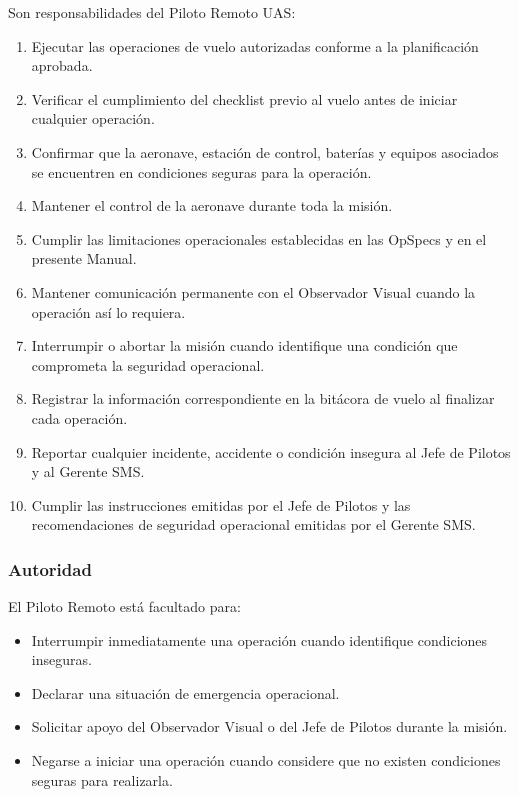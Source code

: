 Son responsabilidades del Piloto Remoto UAS:

\begin{enumerate}[label=\alph*)]

\item Ejecutar las operaciones de vuelo autorizadas conforme a la planificación aprobada.

\item Verificar el cumplimiento del checklist previo al vuelo antes de iniciar cualquier operación.

\item Confirmar que la aeronave, estación de control, baterías y equipos asociados se encuentren en condiciones seguras para la operación.

\item Mantener el control de la aeronave durante toda la misión.

\item Cumplir las limitaciones operacionales establecidas en las OpSpecs y en el presente Manual.

\item Mantener comunicación permanente con el Observador Visual cuando la operación así lo requiera.

\item Interrumpir o abortar la misión cuando identifique una condición que comprometa la seguridad operacional.

\item Registrar la información correspondiente en la bitácora de vuelo al finalizar cada operación.

\item Reportar cualquier incidente, accidente o condición insegura al Jefe de Pilotos y al Gerente SMS.

\item Cumplir las instrucciones emitidas por el Jefe de Pilotos y las recomendaciones de seguridad operacional emitidas por el Gerente SMS.

\end{enumerate}


\subsubsection*{Autoridad}

El Piloto Remoto está facultado para:

\begin{itemize}

\item Interrumpir inmediatamente una operación cuando identifique condiciones inseguras.

\item Declarar una situación de emergencia operacional.

\item Solicitar apoyo del Observador Visual o del Jefe de Pilotos durante la misión.

\item Negarse a iniciar una operación cuando considere que no existen condiciones seguras para realizarla.

\end{itemize}


